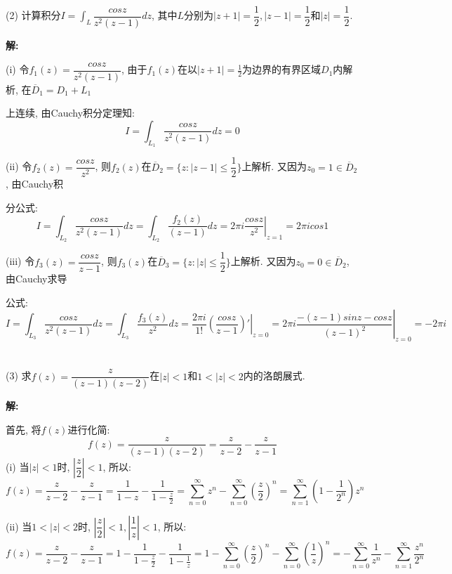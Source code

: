 \documentclass{article}
\begin{document}
(2) 计算积分$I = \displaystyle{\int_L \dfrac{cosz}{z^2(z-1)}dz}$, 其中$L$分别为$|z+1| = \dfrac{1}{2}, |z-1|=\dfrac{1}{2}$和$|z| = \dfrac{1}{2}$. 

\textbf{解:} 

(i) 令$f_1(z) = \dfrac{cosz}{z^2(z-1)}$, 由于$f_1(z)$在以$|z+1|=\frac{1}{2}$为边界的有界区域$D_1$内解析, 在$\overline{D}_1 = D_1+L_1$ 

\hspace{1.3em} 上连续, 由Cauchy积分定理知:
$$ I = \displaystyle{\int_{L_1} \dfrac{cosz}{z^2(z-1)}dz} = 0 $$

(ii) 令$f_2(z) = \dfrac{cosz}{z^2}$, 则$f_2(z)$在$\overline{D}_2 = \{z: |z-1| \leq \dfrac{1}{2} \}$上解析. 又因为$z_0 = 1 \in \overline{D}_2$, 由Cauchy积

\hspace{1.3em} 分公式:
$$ I = \displaystyle{\int_{L_2} \dfrac{cosz}{z^2(z-1)}dz} = \displaystyle{\int_{L_2} \dfrac{f_2(z)}{(z-1)}dz} = 2\pi i \left.\dfrac{cosz}{z^2}\right|_{z=1} = 2\pi i cos1 $$

(iii) 令$f_3(z) = \dfrac{cosz}{z-1}$, 则$f_3(z)$在$\overline{D}_3 = \{z: |z| \leq \dfrac{1}{2} \}$上解析. 又因为$z_0 = 0 \in \overline{D}_2$, 由Cauchy求导

\hspace{1.3em} 公式:
$$ I = \displaystyle{\int_{L_3} \dfrac{cosz}{z^2(z-1)}dz} =  \displaystyle{\int_{L_3} \dfrac{f_3(z)}{z^2}dz} = \dfrac{2\pi i}{1!} \left.\left( \dfrac{cosz}{z-1}\right)'\right| _{z=0} = 2\pi i \left.\dfrac{-(z-1)sinz - cosz}{(z-1)^2}\right|_{z=0} = -2\pi i$$ \\  \\ 

(3) 求$f(z) = \dfrac{z}{(z-1)(z-2)}$在$|z|<1$和$1<|z|<2$内的洛朗展式. 

\textbf{解:} 

首先, 将$f(z)$进行化简:
$$ f(z) = \dfrac{z}{(z-1)(z-2)} = \dfrac{z}{z-2} - \dfrac{z}{z-1}   $$
(i) 当$|z|<1$时, $|\dfrac{z}{2}|<1$, 所以:
$$ f(z) = \dfrac{z}{z-2} - \dfrac{z}{z-1} = \dfrac{1}{1-z}-\dfrac{1}{1-\frac{z}{2}}
     = \sum\limits_{n=0}^{\infty} z^n - \sum\limits_{n=0}^{\infty} (\dfrac{z}{2})^n 
     = \sum\limits_{n=1}^{\infty} (1 - \dfrac{1}{2^n}) z^n $$

(ii) 当$1< |z| < 2$时, $|\dfrac{z}{2}|<1, |\dfrac{1}{z}| <1 $, 所以:
$$ f(z) = \dfrac{z}{z-2} - \dfrac{z}{z-1} = 1 - \dfrac{1}{1-\frac{z}{2}} - \dfrac{1}{1-\frac{1}{z}} 
        = 1 - \sum\limits_{n=0}^{\infty} (\dfrac{z}{2})^n - \sum\limits_{n=0}^{\infty} (\dfrac{1}{z})^n 
        = - \sum\limits_{n=0}^{\infty} \dfrac{1}{z^n} -\sum\limits_{n=1}^{\infty} \dfrac{z^n}{2^n}   $$ \\ \\ 
\end{document}
